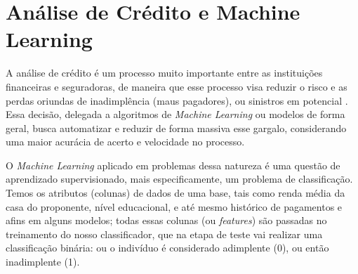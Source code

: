 \section{Análise de Crédito e Machine Learning}

A análise de crédito é um processo muito importante entre as instituições financeiras e seguradoras, de maneira que esse processo visa reduzir o risco e as perdas oriundas de inadimplência (maus pagadores), ou sinistros em potencial \cite{b1}. Essa decisão, delegada a algoritmos de \textit{Machine Learning} ou modelos de forma geral, busca automatizar e reduzir de forma massiva esse gargalo, considerando uma maior acurácia de acerto e velocidade no processo. 

O \textit{Machine Learning} aplicado em problemas dessa natureza é uma questão de aprendizado supervisionado, mais especificamente, um problema de classificação. Temos os atributos (colunas) de dados de uma base, tais como renda média da casa do proponente, nível educacional, e até mesmo histórico de pagamentos e afins em alguns modelos; todas essas colunas (ou \textit{features}) são passadas no treinamento do nosso classificador, que na etapa de teste vai realizar uma classificação binária: ou o indivíduo é considerado adimplente (0), ou então inadimplente (1).